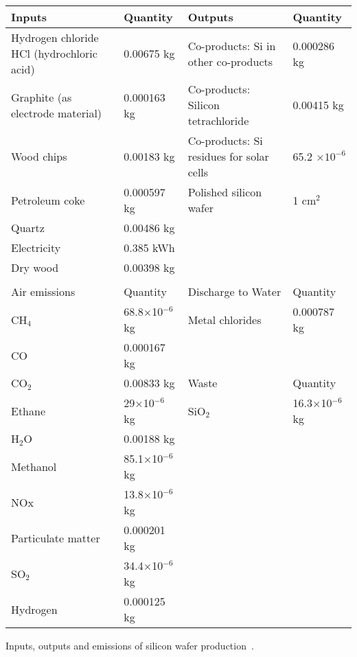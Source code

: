\documentclass[../SustainableHEP.tex]{subfiles}
\begin{document}
\begin{bestpractice}
{{\begin{tabular}{m{}m{}m{}m{}}
\toprule
Inputs&
Quantity&
Outputs&
Quantity\\
\midrule
Hydrogen chloride HCl (hydrochloric acid)&
0.00675 kg&
Co-products: Si in other co-products& 0.000286 kg\\
\midrule
Graphite (as electrode material)& 0.000163 kg & Co-products: Silicon tetrachloride & 0.00415 kg
\\
\midrule
Wood chips&
0.00183 kg & 
Co-products: Si residues for solar cells&
65.2 $\times10^{-6}$\\
\midrule
Petroleum coke& 0.000597 kg &
Polished silicon wafer&
1 cm$^2$\\
\midrule
Quartz&
0.00486 kg &
&
\\
\midrule
Electricity&
0.385 kWh&
& \\
\midrule
Dry wood & 0.00398 kg & &\\
\bottomrule
\\
\toprule
Air emissions&
Quantity&
Discharge to Water&
Quantity\\
\midrule
CH${}_4$&
68.8$\times$10$^{-6}$ kg&
Metal chlorides&
0.000787 kg\\
\midrule
CO&
0.000167 kg&
& 
\\
\midrule
CO${}_2$&
0.00833 kg&
Waste&
Quantity\\
\midrule
Ethane&
29$\times$10$^{-6}$ kg&
SiO${}_2$&
16.3$\times$10$^{-6}$ kg\\
\midrule
H${}_2$O&
0.00188 kg&
&
\\
\midrule
Methanol&
85.1$\times$10$^{-6}$ kg&
&
\\
\midrule
NOx&
13.8$\times$10$^{-6}$ kg&
&
\\
\midrule
Particulate matter&
0.000201 kg&
&
\\
\midrule
SO${}_2$&
34.4$\times$10$^{-6}$ kg&
&
\\
\midrule
Hydrogen&
0.000125 kg&
&
\\
\bottomrule
\end{tabular}
}
\caption[Inputs, outputs and emissions of silicon wafer production]{Inputs, outputs and emissions of silicon wafer production~\cite{ProBasSi}.}
\label{tab:InputOutputEmissions}
}

\end{bestpractice}


\end{document}
